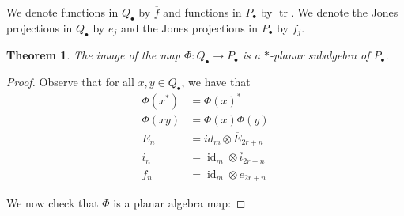\documentclass[11pt]{article}
\theoremstyle{plain}
\newtheorem{thm}{Theorem}[section]
\theoremstyle{definition}
\DeclareMathOperator{\id}{id}
\DeclareMathOperator{\tr}{tr}
\begin{document}
We denote functions in $Q_{\bullet}$ by $\overline{f}$ and functions in $P_{\bullet}$ by $\tr$. We denote the Jones projections in $Q_{\bullet}$ by $e_{j}$ and the Jones projections in  $P_{\bullet}$ by $f_{j}$.

\begin{thm}
The image of the map $\Phi:Q_{\bullet} \to P_{\bullet}$ is a $\ast$-planar subalgebra of $P_{\bullet}$.
\end{thm} 

\begin{proof}
Observe that for all $x,y \in Q_{\bullet}$, we have that 
\begin{align*}
	\Phi(x^{*}) &= \Phi(x)^{\ast} \\
	\Phi(xy) &= \Phi(x)\Phi(y) \\
	E_n &= id_{m}\otimes \overline{E}_{2r+n} \\
	i_n &= \id_{m}\otimes \overline{i}_{2r+n} \\
	f_n &= \id_{m} \otimes e_{2r+n} 
\end{align*}

	We now check that $\Phi$ is a planar algebra map:


\end{proof}
\end{document}
